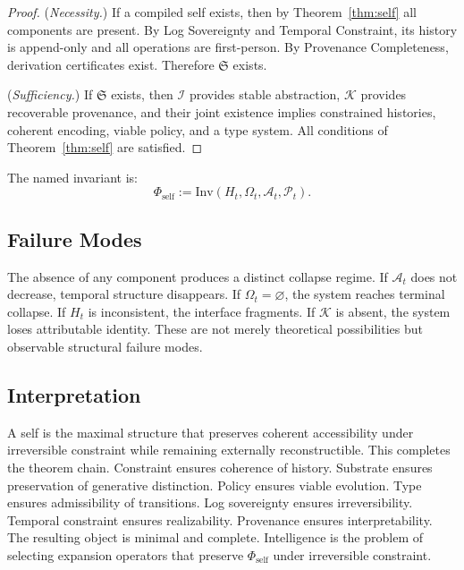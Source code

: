\documentclass[12pt, a4paper]{article}
\theoremstyle{plain}
\theoremstyle{definition}
\theoremstyle{remark}
\begin{document}
\begin{proof}
(\textit{Necessity.}) If a compiled self exists, then by Theorem~\ref{thm:self} all components are present. By Log Sovereignty and Temporal Constraint, its history is append-only and all operations are first-person. By Provenance Completeness, derivation certificates exist. Therefore $\mathfrak{S}$ exists.

(\textit{Sufficiency.}) If $\mathfrak{S}$ exists, then $\mathcal{I}$ provides stable abstraction, $\mathcal{K}$ provides recoverable provenance, and their joint existence implies constrained histories, coherent encoding, viable policy, and a type system. All conditions of Theorem~\ref{thm:self} are satisfied.
\end{proof}

The named invariant is:
\[
\Phi_{\mathrm{self}} := \mathrm{Inv}(H_t, \Omega_t, \mathcal{A}_t, \mathcal{P}_t).
\]

\subsection{Failure Modes}

The absence of any component produces a distinct collapse regime. If $\mathcal{A}_t$ does not decrease, temporal structure disappears. If $\Omega_t = \varnothing$, the system reaches terminal collapse. If $H_t$ is inconsistent, the interface fragments. If $\mathcal{K}$ is absent, the system loses attributable identity. These are not merely theoretical possibilities but observable structural failure modes.

\subsection{Interpretation}

A self is the maximal structure that preserves coherent accessibility under irreversible constraint while remaining externally reconstructible. This completes the theorem chain. Constraint ensures coherence of history. Substrate ensures preservation of generative distinction. Policy ensures viable evolution. Type ensures admissibility of transitions. Log sovereignty ensures irreversibility. Temporal constraint ensures realizability. Provenance ensures interpretability. The resulting object is minimal and complete. Intelligence is the problem of selecting expansion operators that preserve $\Phi_{\mathrm{self}}$ under irreversible constraint.

\end{document}
